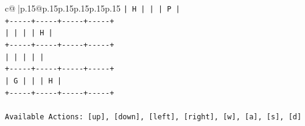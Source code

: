 \documentclass{article}
\begin{document}
{\begin{supertabular}{c@{$\;$}|p{.15\linewidth}@{}p{.15\linewidth}p{.15\linewidth}p{.15\linewidth}p{.15\linewidth}p{.15\linewidth}}
{{{\texttt{|  H  |     |     |  P  |} \\
\texttt{+{-}{-}{-}{-}{-}+{-}{-}{-}{-}{-}+{-}{-}{-}{-}{-}+{-}{-}{-}{-}{-}+} \\
\texttt{|     |     |     |  H  |} \\
\texttt{+{-}{-}{-}{-}{-}+{-}{-}{-}{-}{-}+{-}{-}{-}{-}{-}+{-}{-}{-}{-}{-}+} \\
\texttt{|     |     |     |     |} \\
\texttt{+{-}{-}{-}{-}{-}+{-}{-}{-}{-}{-}+{-}{-}{-}{-}{-}+{-}{-}{-}{-}{-}+} \\
\texttt{|  G  |     |     |  H  |} \\
\texttt{+{-}{-}{-}{-}{-}+{-}{-}{-}{-}{-}+{-}{-}{-}{-}{-}+{-}{-}{-}{-}{-}+} \\
\\ 
\texttt{Available Actions: {[}up{]}, {[}down{]}, {[}left{]}, {[}right{]}, {[}w{]}, {[}a{]}, {[}s{]}, {[}d{]}} \\
            }
        }
    }
     \\ \\


\end{supertabular}}
\end{document}
